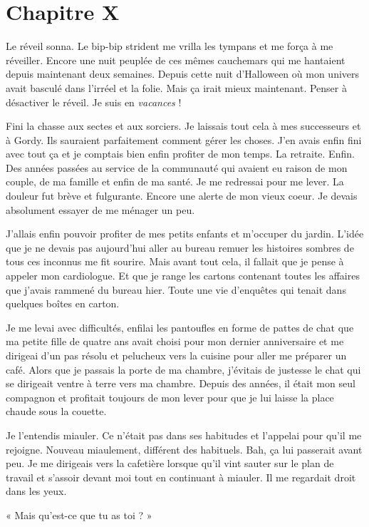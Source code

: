 \chapter{Chapitre X}
Le réveil sonna. Le bip-bip strident me vrilla les tympans et me força à me réveiller. Encore une nuit peuplée de ces 
mêmes cauchemars qui me hantaient depuis maintenant deux semaines. Depuis cette nuit d'Halloween où mon univers 
avait basculé dans l'irréel et la folie. Mais ça irait mieux maintenant. Penser à désactiver le réveil. Je suis en 
\emph{vacances} !

Fini la chasse aux sectes et aux sorciers. Je laissais tout cela à mes successeurs et à Gordy. Ils sauraient 
parfaitement comment gérer les choses. J'en avais enfin fini avec tout ça et je comptais bien enfin profiter de mon 
temps. La retraite. Enfin. Des années passées au service de la communauté qui avaient eu raison de mon couple, de ma 
famille et enfin de ma santé. Je me redressai pour me lever. La douleur fut brève et fulgurante. Encore une alerte 
de mon vieux coeur. Je devais absolument essayer de me ménager un peu. 

J'allais enfin pouvoir profiter de mes petits enfants et m'occuper du jardin. L'idée que je ne devais pas aujourd'hui 
aller au bureau remuer les histoires sombres de tous ces inconnus me fit sourire. Mais avant tout cela, il fallait 
que je pense à appeler mon cardiologue. Et que je range les cartons contenant toutes les affaires que j'avais rammené 
du 
bureau hier. Toute une vie d'enquêtes qui tenait dans quelques boîtes en carton.

Je me levai avec difficultés, enfilai les pantoufles en forme de pattes de chat que ma petite fille de quatre ans avait 
choisi pour mon dernier anniversaire et me dirigeai d'un pas résolu et pelucheux vers la cuisine pour aller me préparer
un café. Alors que je passais la porte de ma chambre, j'évitais de justesse le chat qui se dirigeait ventre à terre 
vers 
ma chambre. Depuis des années, il était mon seul compagnon et profitait toujours de mon lever pour que je lui laisse 
la place chaude sous la couette.

Je l'entendis miauler. Ce n'était pas dans ses habitudes et l'appelai pour qu'il me rejoigne. Nouveau miaulement, 
différent des habituels. Bah, ça lui passerait avant peu. Je me dirigeais vers la cafetière lorsque qu'il vint sauter 
sur le plan de travail et s'assoir devant moi tout en continuant à miauler. Il me regardait droit dans les yeux.

« Mais qu'est-ce que tu as toi ? »

